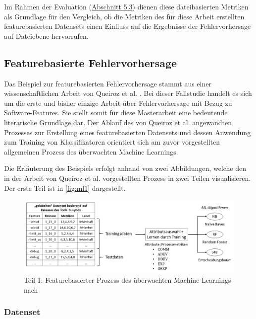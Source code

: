 Im Rahmen der Evaluation (\hyperref[classic-eval]{Abschnitt 5.3}) dienen diese dateibasierten Metriken als Grundlage für den Vergleich, ob die Metriken des für diese Arbeit erstellten featurebasierten Datensets einen Einfluss auf die Ergebnisse der Fehlervorhersage auf Dateiebene hervorrufen. 

\subsection*{Featurebasierte Fehlervorhersage}

Das Beispiel zur featurebasierten Fehlervorhersage stammt aus einer wissenschaftlichen Arbeit von Queiroz et al. \cite{Queiroz2016}. Bei dieser Fallstudie handelt es sich um die erste und bisher einzige Arbeit über Fehlervorhersage mit Bezug zu Software-Features. Sie stellt somit für diese Masterarbeit eine bedeutende literarische Grundlage dar. Der Ablauf des von Queiroz et al. angewandten Prozesses zur Erstellung eines featurebasierten Datensets und dessen Anwendung zum Training von Klassifikatoren orientiert sich am zuvor vorgestellten allgemeinen Prozess des überwachten Machine Learnings.

Die Erläuterung des Beispiels erfolgt anhand von zwei Abbildungen, welche den in der Arbeit von Queiroz et al. vorgestellten Prozess in zwei Teilen visualisieren. Der erste Teil ist in \autoref{fig:ml1} dargestellt.

\begin{figure}[t]
    \centering
    \captionsetup{justification=centering}
    \includegraphics[width=\textwidth]{images/ML1}
    \caption{Teil 1: Featurebasierter Prozess des überwachten Machine Learnings nach \cite{Queiroz2016}}\label{fig:ml1}
\end{figure}

\subsubsection*{Datenset}


